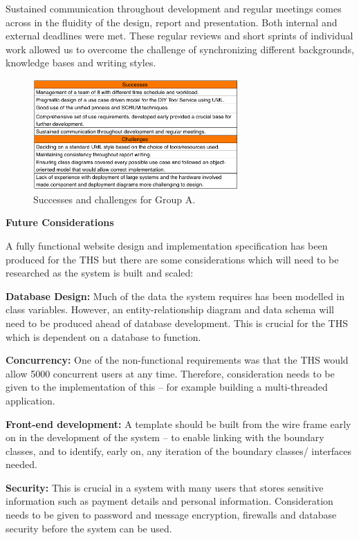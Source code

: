 Sustained communication throughout development and regular meetings
comes across in the fluidity of the design, report and presentation.
Both internal and external deadlines were met. These regular reviews and
short sprints of individual work allowed us to overcome the challenge of
synchronizing different backgrounds, knowledge bases and writing styles.

\begin{figure}[H]
      \centering
      \includegraphics[trim = 0 0 0 0, clip, width=0.7\textwidth]{TempImg/conclusion.png}
      \caption{Successes and challenges for Group A.}
 \end{figure}

\textbf{Future Considerations}

A fully functional website design and implementation specification has
been produced for the THS but there are some considerations which will
need to be researched as the system is built and scaled:

\textbf{Database Design:} Much of the data the system requires has been
modelled in class variables. However, an entity-relationship diagram and
data schema will need to be produced ahead of database development. This
is crucial for the THS which is dependent on a database to function.

\textbf{Concurrency:} One of the non-functional requirements was that
the THS would allow 5000 concurrent users at any time. Therefore,
consideration needs to be given to the implementation of this -- for
example building a multi-threaded application.

\textbf{Front-end development:} A template should be built from the wire
frame early on in the development of the system -- to enable linking
with the boundary classes, and to identify, early on, any iteration of
the boundary classes/ interfaces needed.

\textbf{Security:} This is crucial in a system with many users that
stores sensitive information such as payment details and personal
information. Consideration needs to be given to password and message
encryption, firewalls and database security before the system can be
used.

